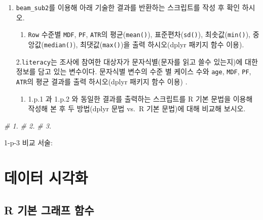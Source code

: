 \documentclass[
  11pt,
]{krantz}
\makeatletter
\newenvironment{Shaded}{\begin{snugshade}}{\end{snugshade}}
\newcommand{\CommentTok}[1]{\textcolor[rgb]{0.37,0.37,0.37}{\textit{#1}}}
\providecommand{\tightlist}{%
  \setlength{\itemsep}{0pt}\setlength{\parskip}{0pt}}
\newenvironment{kframe}{%
\medskip{}
\setlength{\fboxsep}{.8em}
 \def\at@end@of@kframe{}%
 \ifinner\ifhmode%
  \def\at@end@of@kframe{\end{minipage}}%
  \begin{minipage}{\columnwidth}%
 \fi\fi%
 \def\FrameCommand##1{\hskip\@totalleftmargin \hskip-\fboxsep
 \colorbox{shadecolor}{##1}\hskip-\fboxsep
     \hskip-\linewidth \hskip-\@totalleftmargin \hskip\columnwidth}%
 \MakeFramed {\advance\hsize-\width
   \@totalleftmargin\z@ \linewidth\hsize
   \@setminipage}}%
 {\par\unskip\endMakeFramed%
 \at@end@of@kframe}
\renewenvironment{quote}{\begin{kframe}}{\end{kframe}}
\makeatother
\begin{document}
\begin{enumerate}
\def\labelenumi{\alph{enumi}.}
\setcounter{enumi}{15}
\item
  \texttt{beam\_sub2}를 이용해 아래 기술한 결과를 반환하는 스크립트를 작성 후 확인 하시오.

  \begin{enumerate}
  \def\labelenumii{\arabic{enumii}.}
  \tightlist
  \item
    \texttt{Row} 수준별 \texttt{MDF}, \texttt{PF}, \texttt{ATR}의 평균(\texttt{mean()}), 표준편차(\texttt{sd()}), 최솟값(\texttt{min()}), 중앙값(\texttt{median()}), 최댓값(\texttt{max()})을 출력 하시오(dplyr 패키지 함수 이용).
  \end{enumerate}

  2.\texttt{literacy}는 조사에 참여한 대상자가 문자식별(문자를 읽고 쓸수 있는지)에 대한 정보를 담고 있는 변수이다. 문자식별 변수의 수준 별 케이스 수와 \texttt{age}, \texttt{MDF}, \texttt{PF}, \texttt{ATR}의 평균 결과를 출력 하시오(dplyr 패키지 함수 이용) .

  \begin{enumerate}
  \def\labelenumii{\arabic{enumii}.}
  \setcounter{enumii}{2}
  \tightlist
  \item
    1.p.1 과 1.p.2 와 동일한 결과를 출력하는 스크립트를 R 기본 문법을 이용해 작성해 본 후 두 방법(dplyr 문법 vs.~R 기본 문법)에 대해 비교해 보시오.
  \end{enumerate}
\end{enumerate}

\footnotesize

\begin{Shaded}
\begin{Highlighting}[]
\CommentTok{# 1.}
\CommentTok{# 2.}
\CommentTok{# 3.}
\end{Highlighting}
\end{Shaded}

\normalsize

\begin{quote}
1-p-3 비교 서술:
\end{quote}

\hypertarget{uxb370uxc774uxd130-uxc2dcuxac01uxd654}{%
\chapter{데이터 시각화}\label{uxb370uxc774uxd130-uxc2dcuxac01uxd654}}

\hypertarget{r-uxae30uxbcf8-uxadf8uxb798uxd504-uxd568uxc218}{%
\section{R 기본 그래프 함수}\label{r-uxae30uxbcf8-uxadf8uxb798uxd504-uxd568uxc218}}
\end{document}
